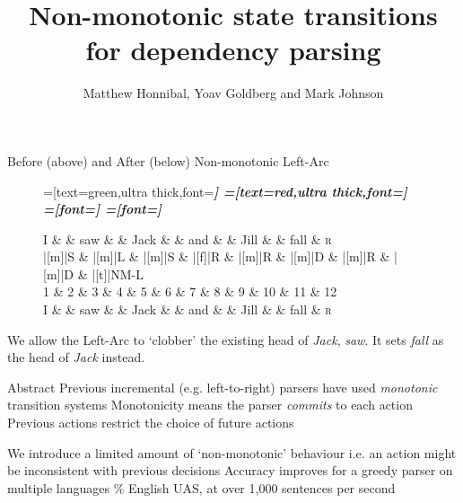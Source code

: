 \documentclass{lecture}
\title{Non-monotonic state transitions for dependency parsing}
\author{Matthew Honnibal, Yoav Goldberg and Mark Johnson}
\begin{document}
\titleslide

\begin{plain}{Before (above) and After (below) Non-monotonic Left-Arc}


\begin{figure}
    \centering
    \begin{dependency}[theme=simple]
        =[text=green,ultra thick,font=\bfseries\itshape]
        =[text=red,ultra thick,font=\bfseries\itshape]
        =[font=\bfseries\itshape]
        =[font=\itshape]

        \begin{deptext}[column sep=.075cm, row sep=.1ex]
            I \&           \& saw \&          \& Jack       \& \& and     \&           \& Jill   \&  \& fall \& \textsc{r} \\
|[m]|S \& |[m]|L \& |[m]|S   \& |[f]|R \& |[m]|R \& |[m]|D \& |[m]|R \& |[m]|D \& |[t]|NM-L \\
    1 \&     2       \& 3  \&   4      \& 5          \& 6 \& 7     \& 8 \& 9 \& 10 \& 11 \& 12 \\
    I \&           \& saw \&          \& Jack       \& \& and     \&           \& Jill   \&      \& fall \& \textsc{r} \\
        \end{deptext}
    
    
\end{dependency}
\end{figure}

We allow the Left-Arc to `clobber' the existing head of \emph{Jack},  \emph{saw}.
It sets \emph{fall} as the head of \emph{Jack} instead. 

\end{plain}



\begin{points}{Abstract}
    \p Previous incremental (e.g. left-to-right) parsers have used
    \emph{monotonic} transition systems
    \p Monotonicity means the parser \emph{commits} to each action
    \p Previous actions restrict the choice of future actions\\
    \vspace*{.2in}
    \par
    \p We introduce a limited amount of `non-monotonic' behaviour
    \p i.e. an action might be inconsistent with previous decisions
    \p Accuracy improves for a greedy parser on multiple languages
    \% English UAS, at over 1,000 sentences per second
\end{points}
\end{document}
